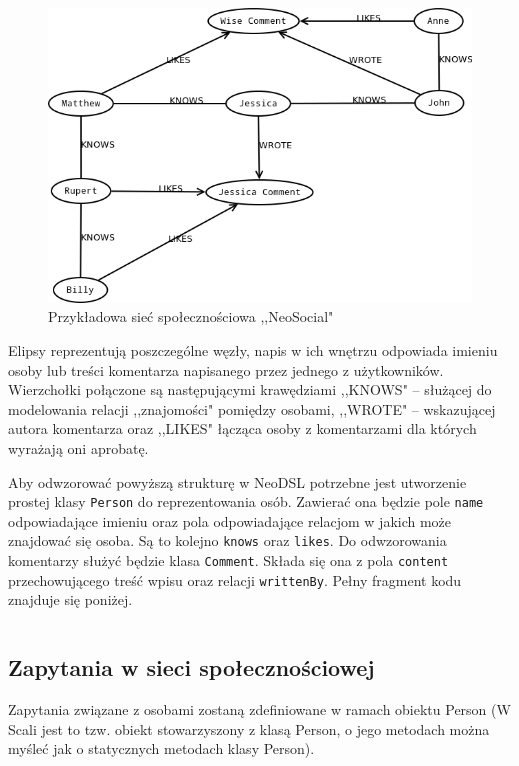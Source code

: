 \documentclass[brudnopis]{xmgr}
\begin{document}
\begin{figure}[H]
	\includegraphics[scale=0.5]{images/socialnetwork-data.png}
	\caption{Przykładowa sieć społecznościowa ,,NeoSocial"}
	\label{fig:neosocial_data}
\end{figure}

Elipsy reprezentują poszczególne węzły, napis w ich wnętrzu odpowiada imieniu osoby lub treści komentarza napisanego przez jednego z użytkowników. Wierzchołki połączone są następującymi krawędziami  ,,KNOWS" -- służącej do modelowania relacji ,,znajomości" pomiędzy osobami, ,,WROTE" -- wskazującej autora komentarza oraz ,,LIKES" łącząca osoby z komentarzami dla których wyrażają oni aprobatę.

Aby odwzorować powyższą strukturę w NeoDSL potrzebne jest utworzenie prostej klasy \texttt{Person} do reprezentowania osób. Zawierać ona będzie pole \texttt{name} odpowiadające imieniu oraz pola odpowiadające relacjom w jakich może znajdować się osoba. Są to kolejno \texttt{knows} oraz \texttt{likes}. Do odwzorowania komentarzy służyć będzie klasa \texttt{Comment}. Składa się ona z pola \texttt{content} przechowującego treść wpisu oraz relacji \texttt{writtenBy}. Pełny fragment kodu znajduje się poniżej.

\inputminted{scala}{listings/scala/examples/socialnetwork/domain-classes.scala}

\subsection{Zapytania w sieci społecznościowej}

Zapytania związane z osobami zostaną zdefiniowane w ramach obiektu Person (W Scali jest to tzw. obiekt stowarzyszony z klasą Person, o jego metodach można myśleć jak o statycznych metodach klasy Person).
\end{document}
